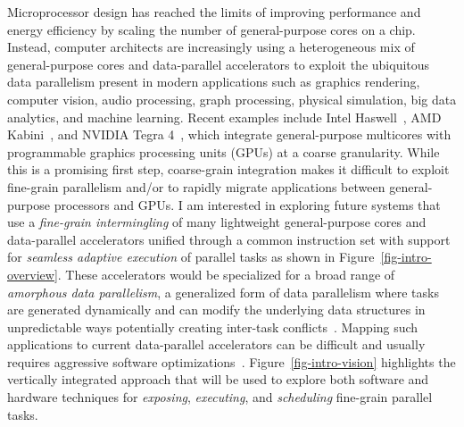 Microprocessor design has reached the limits of improving performance and
energy efficiency by scaling the number of general-purpose cores on a
chip. Instead, computer architects are increasingly using a heterogeneous
mix of general-purpose cores and data-parallel accelerators to exploit
the ubiquitous data parallelism present in modern applications such as
graphics rendering, computer vision, audio processing, graph processing,
physical simulation, big data analytics, and machine learning. Recent
examples include Intel
Haswell~\cite{hammarlund-intel-haswell-ieeemicro2014}, AMD
Kabini~\cite{bouvier-amd-kabini-ieeemicro2014}, and NVIDIA Tegra
4~\cite{krewell-nvidia-tegra4-mpr2013}, which integrate general-purpose
multicores with programmable graphics processing units (GPUs) at a coarse
granularity. While this is a promising first step, coarse-grain
integration makes it difficult to exploit fine-grain parallelism and/or
to rapidly migrate applications between general-purpose processors and
GPUs. I am interested in exploring future systems that use a
\emph{fine-grain intermingling} of many lightweight general-purpose cores
and data-parallel accelerators unified through a common instruction set
with support for \emph{seamless adaptive execution} of parallel tasks as
shown in Figure~\ref{fig-intro-overview}.
These accelerators would be specialized for a broad range of
\emph{amorphous data parallelism}, a generalized form of data parallelism
where tasks are generated dynamically and can modify the underlying data
structures in unpredictable ways potentially creating inter-task
conflicts~\cite{pingali-tao-pldi2011}. Mapping such applications to
current data-parallel accelerators can be difficult and usually requires
aggressive software
optimizations~\cite{luo-gpu-bfs-dac2010,harish-large-graph-gpu-hipc2007,
  hong-cuda-max-warp-ppopp2011,nasre-data-vs-topo-ipdps2013,
  nasre-morph-ppopp2013,mendez-optimizations-amorphous-ppopp2010,
  mendez-gpu-pta-ppopp2012}.
 Figure~\ref{fig-intro-vision} highlights
the vertically integrated approach that will be used to explore both
software and hardware techniques for \emph{exposing}, \emph{executing},
and \emph{scheduling} fine-grain parallel tasks.

